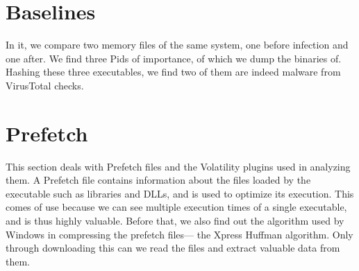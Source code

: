 \documentclass{article}
\begin{document}
\section{Baselines}

In it, we compare two memory files of the same system, one before infection and one after. We find three Pids of importance, of which we dump the binaries of. Hashing these three executables, we find two of them are indeed malware from VirusTotal checks.

\section{Prefetch}

This section deals with Prefetch files and the Volatility plugins used in analyzing them. A Prefetch file contains information about the files loaded by the executable such as libraries and DLLs, and is used to optimize its execution. This comes of use because we can see multiple execution times of a single executable, and is thus highly valuable. Before that, we also find out the algorithm used by Windows in compressing the prefetch files— the Xpress Huffman algorithm. Only through downloading this can we read the files and extract valuable data from them.
\end{document}
